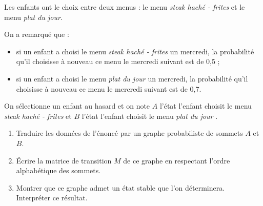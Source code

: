 Les enfants ont le choix entre deux menus : le menu \textit{steak haché - frites} et le menu \textit{plat du jour}.
\par
On a remarqué que :
\par
\begin{itemize}
     \item
     si un enfant a choisi le menu \textit{steak haché - frites} un mercredi, la probabilité qu'il choisisse à nouveau ce menu le mercredi suivant est de 0,5 ;
     \item
     si un enfant a choisi le menu \textit{plat du jour} un mercredi, la probabilité qu'il choisisse à nouveau ce menu le mercredi suivant est de 0,7.
\end{itemize}
\par
On sélectionne un enfant au hasard et on note $A$ l'état \og l'enfant choisit le menu \textit{steak haché - frites} \fg{} et $B$ l'état \og l'enfant choisit le menu \textit{plat du jour} \fg{}.
\par
\begin{enumerate}
     \item Traduire les données de l'énoncé par un graphe probabiliste de sommets $A$ et $B$.
     \item Écrire la matrice de transition $M$ de ce graphe en respectant l'ordre alphabétique des sommets.
     \item Montrer que ce graphe admet un état stable que l'on déterminera.\\
     Interpréter ce résultat.
\end{enumerate}
